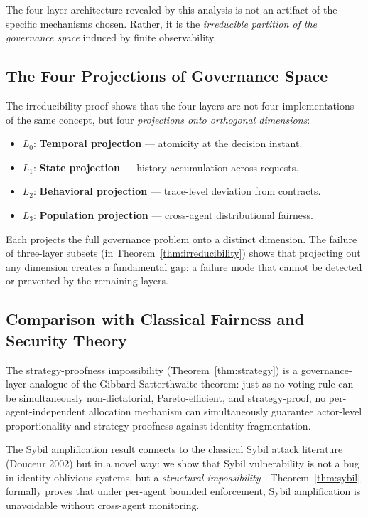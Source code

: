 \documentclass[11pt]{article}
\newcommand{\Layer}[1]{L_{#1}}
\begin{document}
The four-layer architecture revealed by this analysis is not an artifact of the specific mechanisms chosen. Rather, it is the \emph{irreducible partition of the governance space} induced by finite observability.

\subsection{The Four Projections of Governance Space}

The irreducibility proof shows that the four layers are not four implementations of the same concept, but four \emph{projections onto orthogonal dimensions}:

\begin{itemize}[noitemsep]
  \item $\Layer{0}$: \textbf{Temporal projection} --- atomicity at the decision instant.
  \item $\Layer{1}$: \textbf{State projection} --- history accumulation across requests.
  \item $\Layer{2}$: \textbf{Behavioral projection} --- trace-level deviation from contracts.
  \item $\Layer{3}$: \textbf{Population projection} --- cross-agent distributional fairness.
\end{itemize}

Each projects the full governance problem onto a distinct dimension. The failure of three-layer subsets (in Theorem~\ref{thm:irreducibility}) shows that projecting out any dimension creates a fundamental gap: a failure mode that cannot be detected or prevented by the remaining layers.

\subsection{Comparison with Classical Fairness and Security Theory}

The strategy-proofness impossibility (Theorem~\ref{thm:strategy}) is a governance-layer analogue of the Gibbard-Satterthwaite theorem: just as no voting rule can be simultaneously non-dictatorial, Pareto-efficient, and strategy-proof, no per-agent-independent allocation mechanism can simultaneously guarantee actor-level proportionality and strategy-proofness against identity fragmentation.

The Sybil amplification result connects to the classical Sybil attack literature (Douceur 2002) but in a novel way: we show that Sybil vulnerability is not a bug in identity-oblivious systems, but a \emph{structural impossibility}---Theorem~\ref{thm:sybil} formally proves that under per-agent bounded enforcement, Sybil amplification is unavoidable without cross-agent monitoring.
\end{document}
